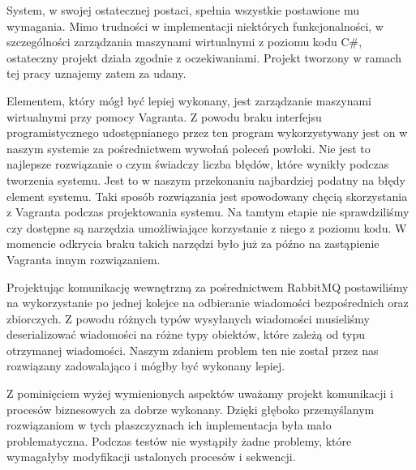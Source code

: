 \documentclass[../podsumowanie.tex]{subfiles}
\begin{document}
\label{final_system_form}

System, w swojej ostatecznej postaci, spełnia wszystkie postawione mu wymagania. Mimo trudności w implementacji niektórych funkcjonalności, w szczególności zarządzania maszynami wirtualnymi z poziomu kodu C\#, ostateczny projekt działa zgodnie z oczekiwaniami. Projekt tworzony w ramach tej pracy uznajemy zatem za udany.

Elementem, który mógł być lepiej wykonany, jest zarządzanie maszynami wirtualnymi przy pomocy Vagranta. Z powodu braku interfejsu programistycznego udostępnianego przez ten program wykorzystywany jest on w naszym systemie za pośrednictwem wywołań poleceń powłoki. Nie jest to najlepsze rozwiązanie o czym świadczy liczba błędów, które wynikły podczas tworzenia systemu. Jest to w naszym przekonaniu najbardziej podatny na błędy element systemu. Taki sposób rozwiązania jest spowodowany chęcią skorzystania z Vagranta podczas projektowania systemu. Na tamtym etapie nie sprawdziliśmy czy dostępne są narzędzia umożliwiające korzystanie z niego z poziomu kodu. W momencie odkrycia braku takich narzędzi było już za późno na zastąpienie Vagranta innym rozwiązaniem.

Projektując komunikację wewnętrzną za pośrednictwem RabbitMQ postawiliśmy na wykorzystanie po jednej kolejce na odbieranie wiadomości bezpośrednich oraz zbiorczych.
Z powodu różnych typów wysyłanych wiadomości musieliśmy deserializować wiadomości na różne typy obiektów, które zależą od typu otrzymanej wiadomości.
Naszym zdaniem problem ten nie został przez nas rozwiązany zadowalająco i mógłby być wykonany lepiej.

Z pominięciem wyżej wymienionych aspektów uważamy projekt komunikacji i procesów biznesowych za dobrze wykonany.
Dzięki głęboko przemyślanym rozwiązaniom w tych płaszczyznach ich implementacja była mało problematyczna.
Podczas testów nie wystąpiły żadne problemy, które wymagałyby modyfikacji ustalonych procesów i sekwencji.
\end{document}
